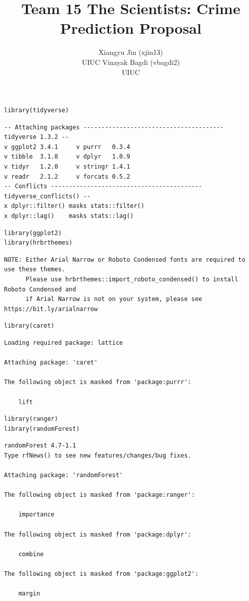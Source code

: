\documentclass[
  article]{jss}
\author{Xiangyu Jin (xjin13)\\UIUC \And Vinayak Bagdi (vbagdi2)\\UIUC}
\title{Team 15 The Scientists: Crime Prediction Proposal}
\begin{document}
\maketitle
\begin{verbatim}
library(tidyverse)
\end{verbatim}

\begin{verbatim}
-- Attaching packages --------------------------------------- tidyverse 1.3.2 --
v ggplot2 3.4.1     v purrr   0.3.4
v tibble  3.1.8     v dplyr   1.0.9
v tidyr   1.2.0     v stringr 1.4.1
v readr   2.1.2     v forcats 0.5.2
-- Conflicts ------------------------------------------ tidyverse_conflicts() --
x dplyr::filter() masks stats::filter()
x dplyr::lag()    masks stats::lag()
\end{verbatim}

\begin{verbatim}
library(ggplot2)
library(hrbrthemes)
\end{verbatim}

\begin{verbatim}
NOTE: Either Arial Narrow or Roboto Condensed fonts are required to use these themes.
      Please use hrbrthemes::import_roboto_condensed() to install Roboto Condensed and
      if Arial Narrow is not on your system, please see https://bit.ly/arialnarrow
\end{verbatim}

\begin{verbatim}
library(caret)
\end{verbatim}

\begin{verbatim}
Loading required package: lattice

Attaching package: 'caret'

The following object is masked from 'package:purrr':

    lift
\end{verbatim}

\begin{verbatim}
library(ranger)
library(randomForest)
\end{verbatim}

\begin{verbatim}
randomForest 4.7-1.1
Type rfNews() to see new features/changes/bug fixes.

Attaching package: 'randomForest'

The following object is masked from 'package:ranger':

    importance

The following object is masked from 'package:dplyr':

    combine

The following object is masked from 'package:ggplot2':

    margin
\end{verbatim}
\end{document}
